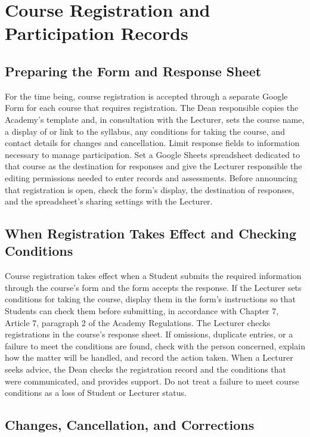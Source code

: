 \newpage
\chapter{Course Registration and Participation Records}

\section{Preparing the Form and Response Sheet}

For the time being, course registration is accepted through a separate Google Form for each course that requires registration. The Dean responsible copies the Academy's template and, in consultation with the Lecturer, sets the course name, a display of or link to the syllabus, any conditions for taking the course, and contact details for changes and cancellation. Limit response fields to information necessary to manage participation.
Set a Google Sheets spreadsheet dedicated to that course as the destination for responses and give the Lecturer responsible the editing permissions needed to enter records and assessments. Before announcing that registration is open, check the form's display, the destination of responses, and the spreadsheet's sharing settings with the Lecturer.

\section{When Registration Takes Effect and Checking Conditions}

Course registration takes effect when a Student submits the required information through the course's form and the form accepts the response. If the Lecturer sets conditions for taking the course, display them in the form's instructions so that Students can check them before submitting, in accordance with Chapter 7, Article 7, paragraph 2 of the Academy Regulations.
The Lecturer checks registrations in the course's response sheet. If omissions, duplicate entries, or a failure to meet the conditions are found, check with the person concerned, explain how the matter will be handled, and record the action taken. When a Lecturer seeks advice, the Dean checks the registration record and the conditions that were communicated, and provides support. Do not treat a failure to meet course conditions as a loss of Student or Lecturer status.

\section{Changes, Cancellation, and Corrections}

